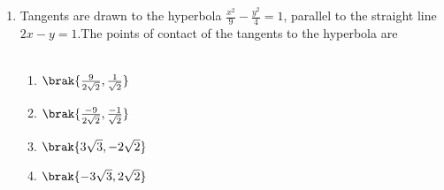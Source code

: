 \documentclass[journal,12pt,twocolumn]{IEEEtran}
\theoremstyle{remark}
\begin{document}
\begin{enumerate}
\begin{enumerate}
		\end{enumerate}
	\item Tangents are drawn to the hyperbola $\frac{x^2}{9}-\frac{y^2}{4}=1$, parallel to the straight line $2x-y=1$.The points of contact of the tangents to the hyperbola
		are \\
		\hfill{}
		\\
		\begin{enumerate}
			\item $\brak{\frac{9}{2\sqrt{2}},\frac{1}{\sqrt{2}}}$ 
			\item $ \brak{\frac{-9}{2\sqrt{2}},\frac{-1}{\sqrt{2}}}$
			\item $\brak{3\sqrt{3},-2\sqrt{2}}$
			\item $ \brak{-3\sqrt{3},2\sqrt{2}}$
		
		\end{enumerate}


\end{enumerate}
\end{document}

